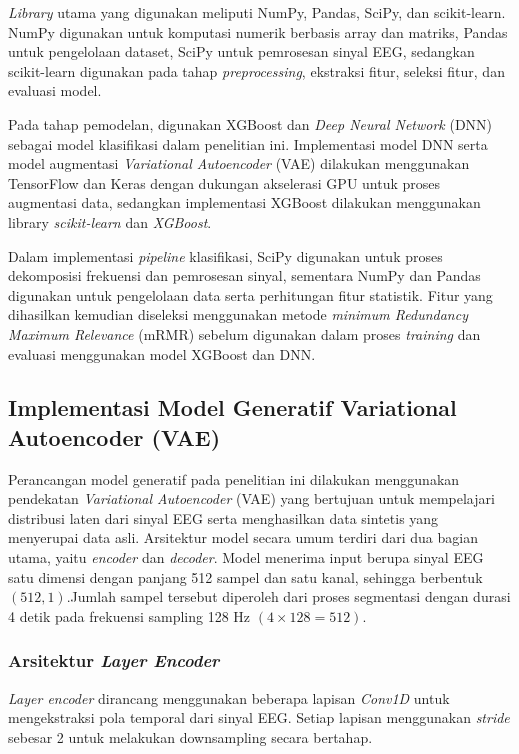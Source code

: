 \textit{Library} utama yang digunakan meliputi NumPy, Pandas, SciPy, dan scikit-learn. NumPy digunakan untuk komputasi numerik berbasis array dan matriks, Pandas untuk pengelolaan dataset, SciPy untuk pemrosesan sinyal EEG, sedangkan scikit-learn digunakan pada tahap \textit{preprocessing}, ekstraksi fitur, seleksi fitur, dan evaluasi model.

Pada tahap pemodelan, digunakan XGBoost dan \textit{Deep Neural Network} (DNN) sebagai model klasifikasi dalam penelitian ini. Implementasi model DNN serta model augmentasi \textit{Variational Autoencoder} (VAE) dilakukan menggunakan TensorFlow dan Keras dengan dukungan akselerasi GPU untuk proses augmentasi data, sedangkan implementasi XGBoost dilakukan menggunakan library \textit{scikit-learn} dan \textit{XGBoost}.

Dalam implementasi \textit{pipeline} klasifikasi, SciPy digunakan untuk proses dekomposisi frekuensi dan pemrosesan sinyal, sementara NumPy dan Pandas digunakan untuk pengelolaan data serta perhitungan fitur statistik. Fitur yang dihasilkan kemudian diseleksi menggunakan metode \textit{minimum Redundancy Maximum Relevance} (mRMR) sebelum digunakan dalam proses \textit{training} dan evaluasi menggunakan model XGBoost dan DNN.

\subsection{Implementasi Model Generatif Variational Autoencoder (VAE)}
\label{Implementasi Model Generatif Variational Autoencoder (VAE)}

Perancangan model generatif pada penelitian ini dilakukan menggunakan pendekatan \textit{Variational Autoencoder} (VAE) yang bertujuan untuk mempelajari distribusi laten dari sinyal EEG serta menghasilkan data sintetis yang menyerupai data asli. Arsitektur model secara umum terdiri dari dua bagian utama, yaitu \textit{encoder} dan \textit{decoder}. Model menerima input berupa sinyal EEG satu dimensi dengan panjang 512 sampel dan satu kanal, sehingga berbentuk $(512, 1)$.Jumlah sampel tersebut diperoleh dari proses segmentasi dengan durasi 4 detik pada frekuensi sampling 128 Hz $(4 \times 128 = 512)$.

\subsubsection{Arsitektur \textit{Layer Encoder}}

\textit{Layer encoder} dirancang menggunakan beberapa lapisan \textit{Conv1D} untuk mengekstraksi pola temporal dari sinyal EEG. Setiap lapisan menggunakan \textit{stride} sebesar 2 untuk melakukan downsampling secara bertahap.

